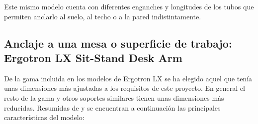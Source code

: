  Este mismo modelo cuenta con diferentes enganches y longitudes de los tubos que permiten anclarlo al suelo, al techo o a la pared indistintamente.

\subsection{Anclaje a una mesa o superficie de trabajo: Ergotron LX Sit-Stand Desk Arm}

 De la gama incluida en los modelos de Ergotron LX se ha elegido aquel que tenía unas dimensiones más ajustadas a los requisitos de este proyecto. En general el resto de la gama y otros soportes similares tienen unas dimensiones más reducidas. Resumidas de \cite{LXSitStand:2018} y \cite{LXSitStandWeb:2018} se encuentran a continuación las principales características del modelo:

